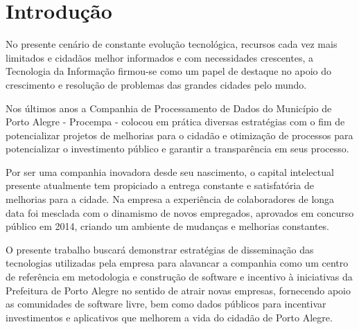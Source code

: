 \chapter{Introdução}

No presente cenário de constante evolução tecnológica, recursos cada vez mais limitados e cidadãos melhor informados e com necessidades crescentes, a Tecnologia da Informação firmou-se como um papel de destaque no apoio do crescimento e resolução de problemas das grandes cidades pelo mundo.

Nos últimos anos a Companhia de Processamento de Dados do Município de Porto Alegre - Procempa - colocou em prática diversas estratégias com o fim de potencializar projetos de melhorias para o cidadão e otimização de processos para potencializar o investimento público e garantir a transparência em seus processo.

Por ser uma companhia inovadora desde seu nascimento, o capital intelectual presente atualmente tem propiciado a entrega constante e satisfatória de melhorias para a cidade. Na empresa a experiência de colaboradores de longa data foi mesclada com o dinamismo de novos empregados, aprovados em concurso público em 2014, criando um ambiente de mudanças e melhorias constantes.

O presente trabalho buscará demonstrar estratégias de disseminação das tecnologias utilizadas pela empresa para alavancar a companhia como um centro de referência em metodologia e construção de software e incentivo à iniciativas da Prefeitura de Porto Alegre no sentido de atrair novas empresas, fornecendo apoio as comunidades de software livre, bem como dados públicos para incentivar investimentos e aplicativos que melhorem a vida do cidadão de Porto Alegre.
